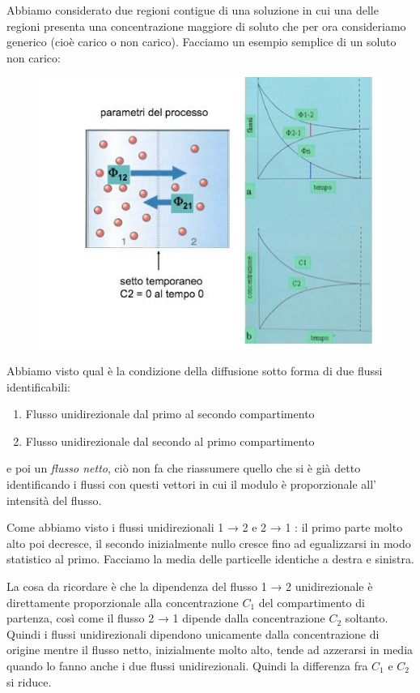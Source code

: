 \documentclass[a4paper,12pt]{article}
\begin{document}
Abbiamo considerato due regioni contigue di una soluzione in cui una delle regioni presenta una concentrazione maggiore di soluto che per ora consideriamo generico (cioè carico o non carico). Facciamo un esempio semplice di un soluto non carico:
\begin{figure}[H]
\centering
\includegraphics[scale=0.5]{immagine/potenziale.jpg}
\caption{}
\end{figure}

Abbiamo visto qual è la condizione della diffusione sotto forma di due flussi identificabili: 
\begin{enumerate}
\item{Flusso unidirezionale dal primo al secondo compartimento}
\item{Flusso unidirezionale dal secondo al primo compartimento}
\end{enumerate}

e poi un \emph{flusso netto}, ciò non fa che riassumere quello che si è già detto identificando i flussi con questi vettori in cui il modulo è proporzionale all' intensità del flusso.

Come abbiamo visto i flussi unidirezionali 1 → 2 e 2 → 1 : il primo parte molto alto poi decresce, il secondo inizialmente nullo cresce fino ad egualizzarsi in modo statistico al primo.
Facciamo la media delle particelle identiche a destra e sinistra.

La cosa da ricordare è che la dipendenza del flusso 1 → 2 unidirezionale è direttamente proporzionale alla concentrazione $C_{1}$ del compartimento di partenza, così come il flusso 2 → 1 dipende dalla concentrazione $C_{2}$ soltanto.
Quindi i flussi unidirezionali dipendono unicamente dalla concentrazione di origine mentre il flusso netto,  inizialmente molto alto, tende ad azzerarsi in media quando lo fanno anche i due flussi unidirezionali. Quindi la differenza fra $C_{1}$ e $C_{2}$ si riduce.
\end{document}
